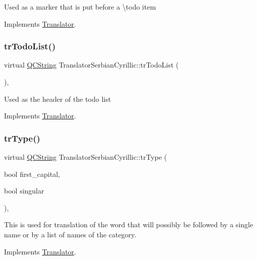 Used as a marker that is put before a \textbackslash{}todo item 

Implements \mbox{\hyperlink{class_translator}{Translator}}.

\mbox{\label{class_translator_serbian_cyrillic_aa7cef410dd0fc65132f72eea861b4a71}} 
\subsubsection{\texorpdfstring{trTodoList()}{trTodoList()}}
{\footnotesize\ttfamily virtual \mbox{\hyperlink{class_q_c_string}{Q\+C\+String}} Translator\+Serbian\+Cyrillic\+::tr\+Todo\+List (\begin{DoxyParamCaption}{ }\end{DoxyParamCaption})\hspace{0.3cm}{\ttfamily [inline]}, {\ttfamily [virtual]}}

Used as the header of the todo list 

Implements \mbox{\hyperlink{class_translator}{Translator}}.

\mbox{\label{class_translator_serbian_cyrillic_ae4ba0340508549f9ae7710327bc889f7}} 
\subsubsection{\texorpdfstring{trType()}{trType()}}
{\footnotesize\ttfamily virtual \mbox{\hyperlink{class_q_c_string}{Q\+C\+String}} Translator\+Serbian\+Cyrillic\+::tr\+Type (\begin{DoxyParamCaption}\item[{bool}]{first\+\_\+capital,  }\item[{bool}]{singular }\end{DoxyParamCaption})\hspace{0.3cm}{\ttfamily [inline]}, {\ttfamily [virtual]}}

This is used for translation of the word that will possibly be followed by a single name or by a list of names of the category. 

Implements \mbox{\hyperlink{class_translator}{Translator}}.

